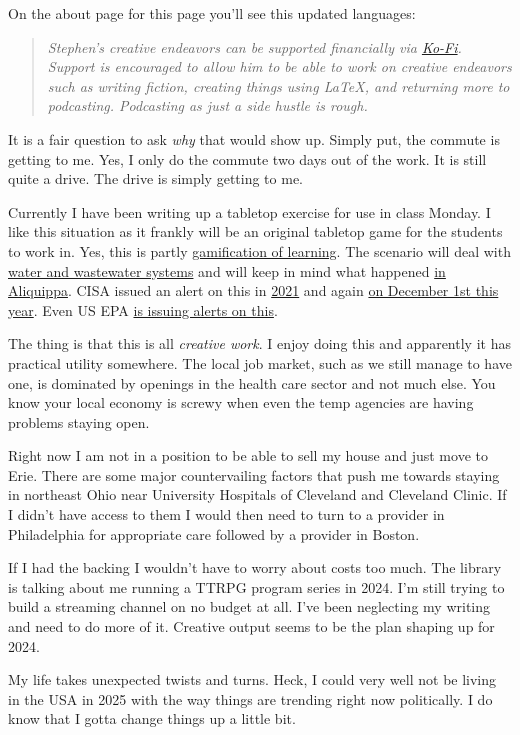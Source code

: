 On the about page for this page you'll see this updated languages:

\begin{quote}
\emph{Stephen's creative endeavors can be supported financially via
\href{https://ko-fi.com/smkellat}{Ko-Fi}. Support is encouraged to allow
him to be able to work on creative endeavors such as writing fiction,
creating things using LaTeX, and returning more to podcasting.
Podcasting as just a side hustle is rough.}
\end{quote}

It is a fair question to ask \emph{why} that would show up. Simply put,
the commute is getting to me. Yes, I only do the commute two days out of
the work. It is still quite a drive. The drive is simply getting to me.

Currently I have been writing up a tabletop exercise for use in class
Monday. I like this situation as it frankly will be an original tabletop
game for the students to work in. Yes, this is partly
\href{https://eric.ed.gov/?qt=game&ts=on&td=on&ti=Gamification}{gamification
of learning}. The scenario will deal with
\href{https://www.cisa.gov/topics/critical-infrastructure-security-and-resilience/critical-infrastructure-sectors/water-and-wastewater-sector}{water
and wastewater systems} and will keep in mind what happened
\href{https://www.cbsnews.com/pittsburgh/news/municipal-water-authority-of-aliquippa-hacked-iranian-backed-cyber-group/}{in
Aliquippa}. CISA issued an alert on this in
\href{https://www.cisa.gov/news-events/cybersecurity-advisories/aa21-287a}{2021}
and again
\href{https://www.cisa.gov/news-events/cybersecurity-advisories/aa23-335a}{on
December 1st this year}. Even US EPA
\href{https://www.epa.gov/waterresilience/epa-cybersecurity-water-sector}{is
issuing alerts on this}.

The thing is that this is all \emph{creative work}. I enjoy doing this
and apparently it has practical utility somewhere. The local job market,
such as we still manage to have one, is dominated by openings in the
health care sector and not much else. You know your local economy is
screwy when even the temp agencies are having problems staying open.

Right now I am not in a position to be able to sell my house and just
move to Erie. There are some major countervailing factors that push me
towards staying in northeast Ohio near University Hospitals of Cleveland
and Cleveland Clinic. If I didn't have access to them I would then need
to turn to a provider in Philadelphia for appropriate care followed by a
provider in Boston.

If I had the backing I wouldn't have to worry about costs too much. The
library is talking about me running a TTRPG program series in 2024. I'm
still trying to build a streaming channel on no budget at all. I've been
neglecting my writing and need to do more of it. Creative output seems
to be the plan shaping up for 2024.

My life takes unexpected twists and turns. Heck, I could very well not
be living in the USA in 2025 with the way things are trending right now
politically. I do know that I gotta change things up a little bit.
